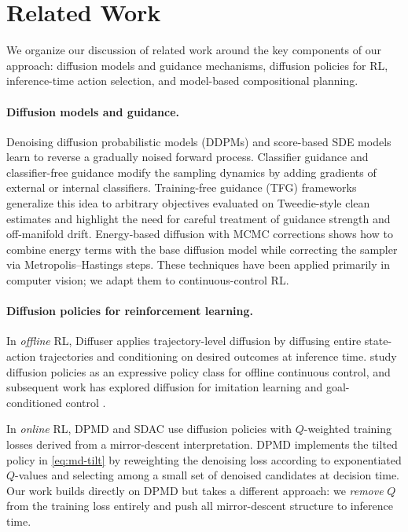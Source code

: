 \documentclass{article}
\theoremstyle{plain}
\theoremstyle{definition}
\theoremstyle{remark}
\begin{document}
\section{Related Work}
\label{sec:related}

We organize our discussion of related work around the key components of our approach: diffusion models and guidance mechanisms, diffusion policies for RL, inference-time action selection, and model-based compositional planning.

\paragraph{Diffusion models and guidance.}
Denoising diffusion probabilistic models (DDPMs) \citep{ho2020denoising} and score-based SDE models \citep{song2021sde} learn to reverse a gradually noised forward process.
Classifier guidance \citep{dhariwal2021beatgans} and classifier-free guidance \citep{ho2022classifierfree} modify the sampling dynamics by adding gradients of external or internal classifiers.
Training-free guidance (TFG) frameworks \citep{ye2024tfg,bansal2023universal} generalize this idea to arbitrary objectives evaluated on Tweedie-style clean estimates and highlight the need for careful treatment of guidance strength and off-manifold drift.
Energy-based diffusion with MCMC corrections \citep{du2023reduce_reuse_recycle} shows how to combine energy terms with the base diffusion model while correcting the sampler via Metropolis--Hastings steps.
These techniques have been applied primarily in computer vision; we adapt them to continuous-control RL.

\paragraph{Diffusion policies for reinforcement learning.}
In \emph{offline} RL, Diffuser \citep{janner2022diffuser} applies trajectory-level diffusion by diffusing entire state-action trajectories and conditioning on desired outcomes at inference time.
\citet{wang2023diffusion} study diffusion policies as an expressive policy class for offline continuous control, and subsequent work has explored diffusion for imitation learning and goal-conditioned control \citep{chi2023diffusion,reuss2023goal}.

In \emph{online} RL, DPMD and SDAC \citep{ma2025soft} use diffusion policies with $Q$-weighted training losses derived from a mirror-descent interpretation.
DPMD implements the tilted policy in \cref{eq:md-tilt} by reweighting the denoising loss according to exponentiated $Q$-values and selecting among a small set of denoised candidates at decision time.
Our work builds directly on DPMD but takes a different approach: we \emph{remove} $Q$ from the training loss entirely and push all mirror-descent structure to inference time.
\end{document}
